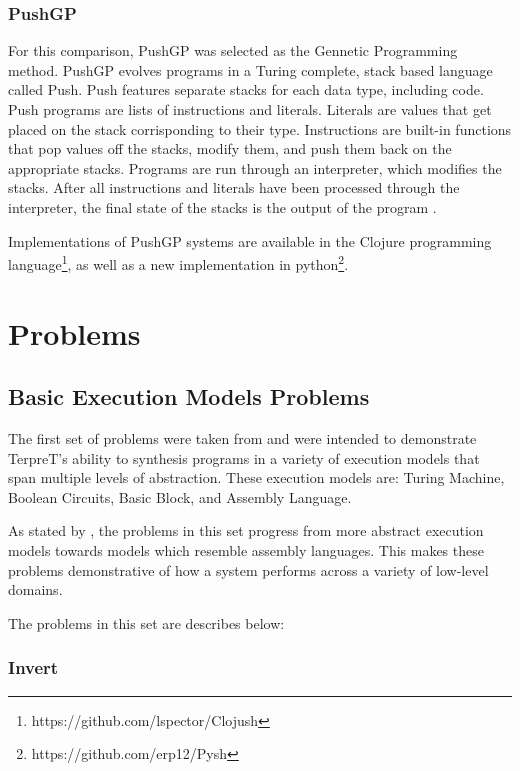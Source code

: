 \subsubsection{PushGP}

For this comparison, PushGP was selected as the Gennetic Programming method. PushGP evolves programs in a Turing complete, stack based language called Push. Push features separate stacks for each data type, including code. Push programs are lists of instructions and literals. Literals are values that get placed on the stack corrisponding to their type. Instructions are built-in functions that pop values off the stacks, modify them, and push them back on the appropriate stacks. Programs are run through an interpreter, which modifies the stacks. After all instructions and literals have been processed through the interpreter, the final state of the stacks is the output of the program \cite{Spector2002}.


Implementations of PushGP systems are available in the Clojure programming language\footnote{https://github.com/lspector/Clojush}, as well as a new implementation in python\footnote{https://github.com/erp12/Pysh}.

\section{Problems}
\subsection{Basic Execution Models Problems}
The first set of problems were taken from \cite{Gaunt2016} and were intended to demonstrate TerpreT's ability to synthesis programs in a variety of execution models that span multiple levels of abstraction. These execution models are: Turing Machine, Boolean Circuits, Basic Block, and Assembly Language. 

As stated by \cite{Gaunt2016}, the problems in this set progress from more abstract execution models towards models which resemble assembly languages. This makes these problems demonstrative of how a system performs across a variety of low-level domains. 
 
The problems in this set are describes below:

\subsubsection{Invert}

